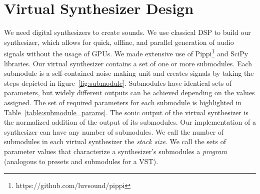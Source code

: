 \documentclass[runningheads,a4paper]{llncs}
\begin{document}
\section{Virtual Synthesizer Design}
\begin{table}[tbp]
\centering
{}
\caption{Synthesizer submodule parameters. There are $10^{15}$ unique programs are possible. Each synthesizer can contain any number of submodules}
\label{table:submodule_params}
\end{table}
 We need digital synthesizers to create sounds. We use classical DSP to build our synthesizer, which allows for quick, offline, and parallel generation of audio signals without the usage of GPUs. We made extensive use of Pippi\footnote{https://github.com/luvsound/pippi} and SciPy~\cite{jones2001scipy} libraries. Our virtual synthesizer contains a set of one or more submodules. Each submodule is a self-contained noise making unit and creates signals by taking the steps depicted in figure~\ref{fig:submodule}.  Submodules have identical sets of parameters, but widely different outputs can be achieved depending on the values assigned. The set of required parameters for each submodule is highlighted in Table~\ref{table:submodule_params}. The sonic output of the virtual synthesizer is the normalized addition of the output of its submodules. Our implementation of a synthesizer can have any number of submodules. We call the number of submodules in each virtual synthesizer the \textit{stack size}. We call the sets of parameter values that characterize a synthesizer's submodules a \textit{program} (analogous to presets and submodules for a VST).   
\end{document}
